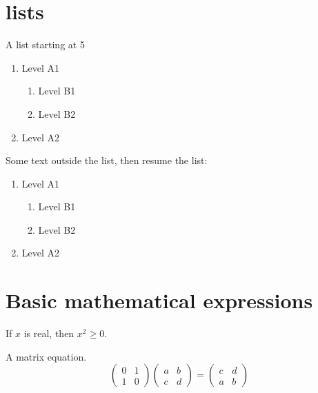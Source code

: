 \documentclass{article}
\begin{document}

\section{lists}

A list starting at 5

\begin{enumerate}[start=5]
\item Level A1
  \begin{enumerate}
  \item Level B1
  \item Level B2
  \end{enumerate}
\item Level A2
\end{enumerate}


Some text outside the list, then resume the list:

\begin{enumerate}[resume=true]
\item Level A1
  \begin{enumerate}
  \item Level B1
  \item Level B2
  \end{enumerate}
\item Level A2
\end{enumerate}


\section{Basic mathematical expressions}

If $x$ is real, then $x^{2} \geq 0$.

A matrix equation.
\[
\begin{pmatrix}0&1\\1&0\end{pmatrix}
\begin{pmatrix}a&b\\c&d\end{pmatrix}
=
\begin{pmatrix}c&d\\a&b\end{pmatrix}
\]
\end{document}
